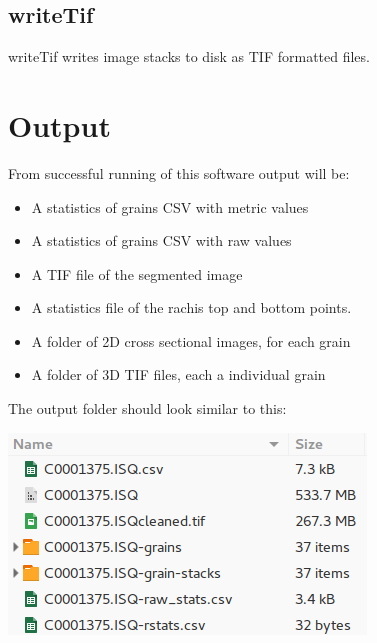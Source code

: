 \documentclass[a4paper]{article}
\begin{document}
\subsection{writeTif}
\label{sec:orgba1736b}
writeTif writes image stacks to disk as TIF formatted files.


\section{Output}
\label{sec:org7bf3771}
From successful running of this software output will be:
\begin{itemize}
\item A statistics of grains CSV with metric values
\item A statistics of grains CSV with raw values
\item A TIF file of the segmented image
\item A statistics file of the rachis top and bottom points.
\item A folder of 2D cross sectional images, for each grain
\item A folder of 3D TIF files, each a individual grain
\end{itemize}

The output folder should look similar to this:

\begin{center}
\begin{center}
\includegraphics[width=.9\linewidth]{./directory.png}
\end{center}
\end{center}
\end{document}
